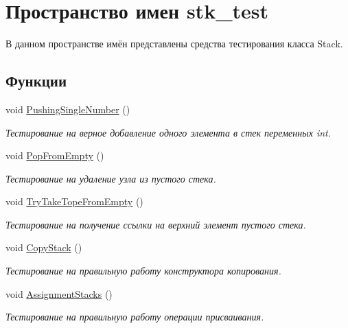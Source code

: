 \hypertarget{namespacestk__test}{}\section{Пространство имен stk\+\_\+test}
\label{namespacestk__test}


В данном пространстве имён представлены средства тестирования класса Stack.  


\subsection*{Функции}
\begin{DoxyCompactItemize}
\item 
void \hyperlink{namespacestk__test_a38a19eb652f1ac8ca90dfa8236b187ff}{Pushing\+Single\+Number} ()
\begin{DoxyCompactList}\small\item\em Тестирование на верное добавление одного элемента в стек переменных int. \end{DoxyCompactList}\item 
void \hyperlink{namespacestk__test_a8c0697020af071c235acd621eb93a83b}{Pop\+From\+Empty} ()
\begin{DoxyCompactList}\small\item\em Тестирование на удаление узла из пустого стека. \end{DoxyCompactList}\item 
void \hyperlink{namespacestk__test_a263e5f6322755d69d17e5cd0f139a0da}{Try\+Take\+Tope\+From\+Empty} ()
\begin{DoxyCompactList}\small\item\em Тестирование на получение ссылки на верхний элемент пустого стека. \end{DoxyCompactList}\item 
void \hyperlink{namespacestk__test_acef2e62a5fc6f13e8de2fb4d4bfb5162}{Copy\+Stack} ()
\begin{DoxyCompactList}\small\item\em Тестирование на правильную работу конструктора копирования. \end{DoxyCompactList}\item 
void \hyperlink{namespacestk__test_a216906bc10bd75cc160aeb2cd29c531f}{Assignment\+Stacks} ()
\begin{DoxyCompactList}\small\item\em Тестирование на правильную работу операции присваивания. \end{DoxyCompactList}\item 

\end{DoxyCompactItemize}
